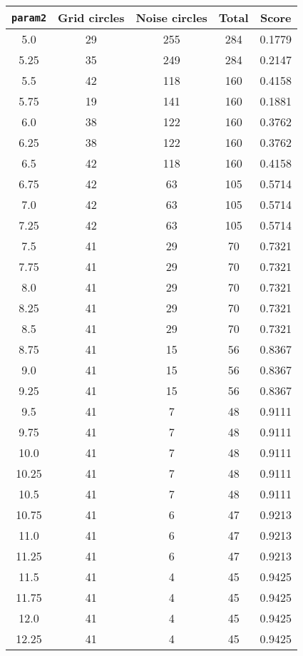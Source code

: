 \documentclass[letterpaper, 12pt]{article}
\begin{document}
\begin{longtable}{|c|c|c|c|c|}
\hline
\textbf{\texttt{param2}} & \textbf{Grid circles} & \textbf{Noise circles} & \textbf{Total} & \textbf{Score} \\
\hline
5.0 & 29 & 255 & 284 & 0.1779 \\
\hline
5.25 & 35 & 249 & 284 & 0.2147 \\
\hline
5.5 & 42 & 118 & 160 & 0.4158 \\
\hline
5.75 & 19 & 141 & 160 & 0.1881 \\
\hline
6.0 & 38 & 122 & 160 & 0.3762 \\
\hline
6.25 & 38 & 122 & 160 & 0.3762 \\
\hline
6.5 & 42 & 118 & 160 & 0.4158 \\
\hline
6.75 & 42 & 63 & 105 & 0.5714 \\
\hline
7.0 & 42 & 63 & 105 & 0.5714 \\
\hline
7.25 & 42 & 63 & 105 & 0.5714 \\
\hline
7.5 & 41 & 29 & 70 & 0.7321 \\
\hline
7.75 & 41 & 29 & 70 & 0.7321 \\
\hline
8.0 & 41 & 29 & 70 & 0.7321 \\
\hline
8.25 & 41 & 29 & 70 & 0.7321 \\
\hline
8.5 & 41 & 29 & 70 & 0.7321 \\
\hline
8.75 & 41 & 15 & 56 & 0.8367 \\
\hline
9.0 & 41 & 15 & 56 & 0.8367 \\
\hline
9.25 & 41 & 15 & 56 & 0.8367 \\
\hline
9.5 & 41 & 7 & 48 & 0.9111 \\
\hline
9.75 & 41 & 7 & 48 & 0.9111 \\
\hline
10.0 & 41 & 7 & 48 & 0.9111 \\
\hline
10.25 & 41 & 7 & 48 & 0.9111 \\
\hline
10.5 & 41 & 7 & 48 & 0.9111 \\
\hline
10.75 & 41 & 6 & 47 & 0.9213 \\
\hline
11.0 & 41 & 6 & 47 & 0.9213 \\
\hline
11.25 & 41 & 6 & 47 & 0.9213 \\
\hline
11.5 & 41 & 4 & 45 & 0.9425 \\
\hline
11.75 & 41 & 4 & 45 & 0.9425 \\
\hline
12.0 & 41 & 4 & 45 & 0.9425 \\
\hline
12.25 & 41 & 4 & 45 & 0.9425 \\
\hline

\end{longtable}
\end{document}
